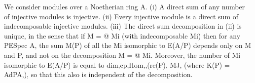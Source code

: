 
\begin{theorem}[Theorem 18.5]\label{mcrt-auto-theorem-18-5}\uses{}
\begin{mathematicalrecord}
We consider modules over a Noetherian ring A.
  (i) A direct sum of any number of injective modules is injective.
  (ii) Every injective module is a direct sum of indecomposable injective
modules.
  (iii) The direct sum decomposition in (ii) is unique, in the sense that if
         M = @ Mi (with indecomposable          Mi)
then for any PESpec A, the sum M(P) of all the Mi isomorphic to E(A/P)
depends only on M and P, and not on the decomposition M = @ Mi.
Moreover, the number of Mi isomorphic to E(A/P) is equal to
          dim,cp,Hom,,(rc(P), MJ, (where K(P) = AdPA,),
so that this also is independent of the decomposition.
\end{mathematicalrecord}
\end{theorem}
